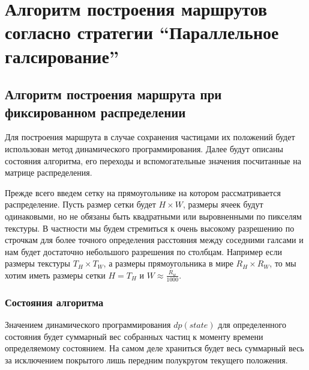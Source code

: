 \chapter{Алгоритм построения маршрутов согласно стратегии
``Параллельное галсирование''}
\section{Алгоритм построения маршрута при
 фиксированном распределении}

\def\dprule{ \rule[-2ex]{0pt}{4ex} }

Для построения маршрута в случае сохранения частицами их положений будет использован метод
динамического программирования. Далее будут описаны состояния алгоритма, его переходы и
вспомогательные значения посчитанные на матрице распределения.

Прежде всего введем сетку на прямоугольнике на котором рассматривается распределение.
Пусть размер сетки будет $H \times W$, размеры ячеек будут одинаковыми, но не обязаны
быть квадратными или выровненными по пикселям текстуры. В частности мы будем стремиться
к очень высокому разрешению по строчкам для более точного определения расстояния между
соседними галсами и нам будет достаточно небольшого разрешения по столбцам. Например 
если размеры текстуры $T_H \times T_W$, а размеры прямоугольника в мире $R_H \times R_W$,
то мы хотим иметь размеры сетки $H = T_H$ и $W \approx \frac {R_w} {1000}$.

\subsection{Состояния алгоритма}
Значением динамического программирования $dp(state)$ для определенного состояния будет
суммарный вес собранных частиц к моменту времени определяемому состоянием. На самом деле
храниться будет весь суммарный весь за исключением покрытого лишь передним полукругом
текущего положения. 

